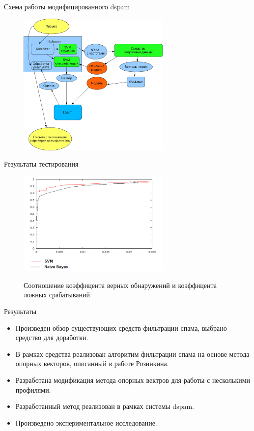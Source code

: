 \documentclass{beamer}
\begin{document}
\begin{frame}{Схема работы модифицированного dspam}
\begin{figure}[h]
\begin{center}
    \includegraphics[width=7.5cm]{../img/working_scheme2}
\end{center}
\end{figure}
\end{frame}

\begin{frame}{Результаты тестирования}
\begin{figure}[h]
\begin{center}
    \includegraphics[width=7.5cm]{../img/graphic}
\end{center}
    Соотношение коэффицента верных обнаружений и коэффицента ложных срабатываний
\end{figure}

\end{frame}


\begin{frame}{Результаты}
\begin{itemize}
\item Произведен обзор существующих средств фильтрации спама, выбрано средство для доработки.
\item В рамках средства реализован алгоритим фильтрации спама на основе метода опорных векторов, описанный в работе Розинкина.
\item Разработана модификация метода опорных вектров для работы с несколькими профилями.
\item Разработанный метод реализован в рамках системы dspam.
\item Произведено экспериментальное исследование.
\end{itemize}
\end{frame}
\end{document}

